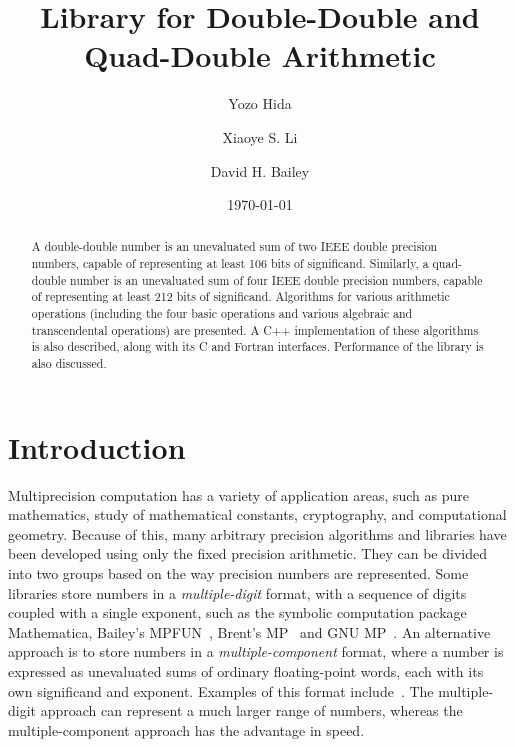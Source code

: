 \documentclass[11pt]{article}
\title{Library for Double-Double and Quad-Double Arithmetic\footnotemark[1]}
\author{Yozo Hida\footnotemark[2] \and Xiaoye S. Li\footnotemark[3]
  \and David H. Bailey\footnotemark[3]}
\date{\today}
\theoremstyle{definition}
\begin{document}
\maketitle

\renewcommand{\thefootnote}{\fnsymbol{footnote}}


\renewcommand{\thefootnote}{\arabic{footnote}}

\vspace{1cm}
\begin{abstract}
  A double-double number is an unevaluated sum of two IEEE double 
  precision numbers, capable of representing at least 106 bits of 
  significand.   Similarly, a quad-double number is an unevaluated sum of 
  four IEEE double precision numbers, capable of representing at least 
  212 bits of significand.  Algorithms for various arithmetic operations 
  (including the four basic operations and various algebraic and 
  transcendental operations) are presented. A C++ implementation of 
  these algorithms is also described, along with its C and Fortran 
  interfaces.  Performance of the library is also discussed.
\end{abstract}

\newpage
\tableofcontents
\newpage

\section{Introduction} \label{sec:intro}
Multiprecision computation has a variety of application areas, such as
pure mathematics, study of mathematical constants, cryptography,
and computational geometry. Because of this, many arbitrary precision 
algorithms and libraries have been developed using only the fixed
precision arithmetic. They can be divided into two groups based on
the way precision numbers are represented. Some libraries store numbers in a
{\em multiple-digit} format, with a sequence of digits coupled with a 
single exponent, such as the symbolic computation package
Mathematica, Bailey's MPFUN~\cite{bai-mp}, Brent's MP~\cite{brent} and
GNU MP~\cite{gnu-mp}.  An alternative approach is to store numbers
in a {\em multiple-component} format, where a number is expressed
as unevaluated sums of ordinary floating-point words, each with its own
significand and exponent.  Examples of this format 
include~\cite{dek71,pri92,she97}.  The multiple-digit approach can 
represent a much larger range of numbers, whereas the multiple-component 
approach has the advantage in speed.
\end{document}
